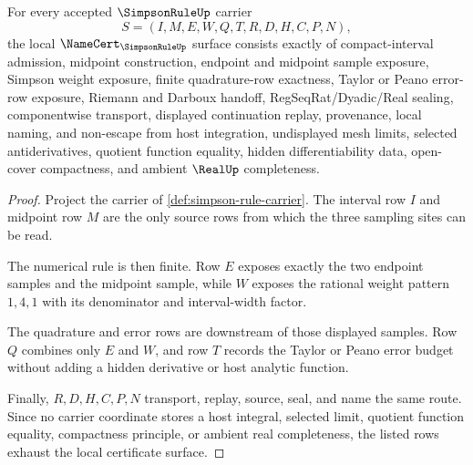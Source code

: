 \begin{theorem}
\label{thm:simpson-rule-namecert-obligations}
For every accepted $\SimpsonRuleUp$ carrier
$$
S=(I,M,E,W,Q,T,R,D,H,C,P,N),
$$
the local $\NameCert_{\SimpsonRuleUp}$ surface consists exactly of compact-interval admission, midpoint construction, endpoint and midpoint sample exposure, Simpson weight exposure, finite quadrature-row exactness, Taylor or Peano error-row exposure, Riemann and Darboux handoff, RegSeqRat/Dyadic/Real sealing, componentwise transport, displayed continuation replay, provenance, local naming, and non-escape from host integration, undisplayed mesh limits, selected antiderivatives, quotient function equality, hidden differentiability data, open-cover compactness, and ambient $\RealUp$ completeness.
\end{theorem}
\begin{proof}
Project the carrier of \autoref{def:simpson-rule-carrier}. The interval row $I$ and midpoint row $M$ are the only source rows from which the three sampling sites can be read.

The numerical rule is then finite. Row $E$ exposes exactly the two endpoint samples and the midpoint sample, while $W$ exposes the rational weight pattern $1,4,1$ with its denominator and interval-width factor.

The quadrature and error rows are downstream of those displayed samples. Row $Q$ combines only $E$ and $W$, and row $T$ records the Taylor or Peano error budget without adding a hidden derivative or host analytic function.

Finally, $R,D,H,C,P,N$ transport, replay, source, seal, and name the same route. Since no carrier coordinate stores a host integral, selected limit, quotient function equality, compactness principle, or ambient real completeness, the listed rows exhaust the local certificate surface.
\end{proof}

